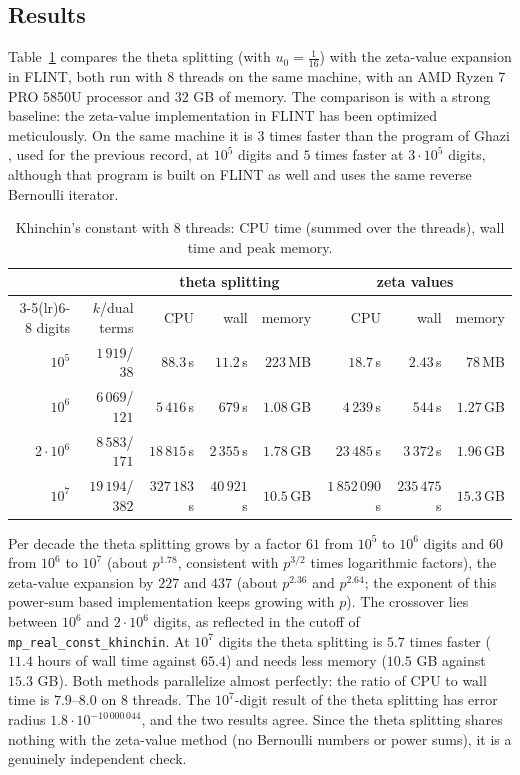 \documentclass[11pt,reqno]{amsart}
\theoremstyle{definition}
\theoremstyle{remark}
\begin{document}
\subsection{Results}\label{sec:khresults}
Table~\ref{tab:khinchin} compares the theta splitting (with $u_0 = \frac1{16}$) with the zeta-value expansion in FLINT,
both run with $8$ threads on the same machine, with an AMD Ryzen 7 PRO 5850U processor and $32$ GB of memory. The
comparison is with a strong baseline: the zeta-value implementation in FLINT has been optimized meticulously. On the
same machine it is $3$ times faster than the program of Ghazi \cite{Gha26}, used for the previous record, at $10^5$
digits and $5$ times faster at $3\cdot10^5$ digits, although that program is built on FLINT as well and uses the same
reverse Bernoulli iterator.
\begin{table}[ht]
\centering\footnotesize
\setlength{\tabcolsep}{3.5pt}
\begin{tabular}{rrrrrrrr}
\toprule
& & \multicolumn{3}{c}{theta splitting} & \multicolumn{3}{c}{zeta values} \\
\cmidrule(lr){3-5}\cmidrule(lr){6-8}
digits & $k$/dual terms & CPU & wall & memory & CPU & wall & memory \\
\midrule
$10^5$ & $1\,919$/$38$ & $88.3$\,s & $11.2$\,s & $223$\,MB & $18.7$\,s & $2.43$\,s & $78$\,MB \\
$10^6$ & $6\,069$/$121$ & $5\,416$\,s & $679$\,s & $1.08$\,GB & $4\,239$\,s & $544$\,s & $1.27$\,GB \\
$2\cdot10^6$ & $8\,583$/$171$ & $18\,815$\,s & $2\,355$\,s & $1.78$\,GB & $23\,485$\,s & $3\,372$\,s & $1.96$\,GB \\
$10^7$ & $19\,194$/$382$ & $327\,183$\,s & $40\,921$\,s & $10.5$\,GB & $1\,852\,090$\,s & $235\,475$\,s & $15.3$\,GB \\
\bottomrule
\end{tabular}
\vspace{\abovecaptionskip}
\caption{Khinchin's constant with $8$ threads: CPU time (summed over the threads), wall time and peak memory.}
\label{tab:khinchin}
\end{table}
Per decade the theta splitting grows by a factor $61$ from $10^5$ to $10^6$ digits and $60$ from $10^6$ to $10^7$ (about
$p^{1.78}$, consistent with $p^{3/2}$ times logarithmic factors), the zeta-value expansion by $227$ and $437$ (about
$p^{2.36}$ and $p^{2.64}$; the exponent of this power-sum based implementation keeps growing with $p$). The crossover
lies between $10^6$ and $2\cdot10^6$ digits, as reflected in the cutoff of \texttt{mp\_real\_const\_khinchin}. At $10^7$
digits the theta splitting is $5.7$ times faster ($11.4$ hours of wall time against $65.4$) and needs less memory
($10.5$ GB against $15.3$ GB). Both methods parallelize almost perfectly: the ratio of CPU to wall time is $7.9$--$8.0$ on
$8$ threads. The $10^7$-digit result of the theta splitting has error radius $1.8\cdot10^{-10\,000\,044}$, and the
two results agree. Since the theta splitting shares nothing with the zeta-value method (no Bernoulli numbers or power
sums), it is a genuinely independent check.
\end{document}
